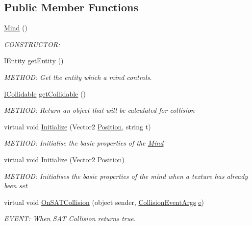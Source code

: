 \subsection*{Public Member Functions}
\begin{DoxyCompactItemize}
\item 
\hyperlink{a00318_aa352dcc92860d1304d4b1c71a0fe5d96}{Mind} ()
\begin{DoxyCompactList}\small\item\em C\+O\+N\+S\+T\+R\+U\+C\+T\+OR\+: \end{DoxyCompactList}\item 
\hyperlink{a00438}{I\+Entity} \hyperlink{a00318_a9585d4438e12299a42aaed4ee6fb88b6}{get\+Entity} ()
\begin{DoxyCompactList}\small\item\em M\+E\+T\+H\+OD\+: Get the entity which a mind controls. \end{DoxyCompactList}\item 
\hyperlink{a00426}{I\+Collidable} \hyperlink{a00318_aa36d6fcb8d80f1398855cea671ce1078}{get\+Collidable} ()
\begin{DoxyCompactList}\small\item\em M\+E\+T\+H\+OD\+: Return an object that will be calculated for collision \end{DoxyCompactList}\item 
virtual void \hyperlink{a00318_a386406a6250e4f7e59d0a048545ecc46}{Initialize} (Vector2 \hyperlink{a00318_ad94b3975c0873fee06b5bd5a75bd38cd}{Position}, string t)
\begin{DoxyCompactList}\small\item\em M\+E\+T\+H\+OD\+: Initialise the basic properties of the \hyperlink{a00318}{Mind} \end{DoxyCompactList}\item 
virtual void \hyperlink{a00318_a353d7d2bb1035aefebf0ae3e3f1d1488}{Initialize} (Vector2 \hyperlink{a00318_ad94b3975c0873fee06b5bd5a75bd38cd}{Position})
\begin{DoxyCompactList}\small\item\em M\+E\+T\+H\+OD\+: Initialises the basic properties of the mind when a texture has already been set \end{DoxyCompactList}\item 
virtual void \hyperlink{a00318_ac278d4358d794426251d1b87b6aa7b82}{On\+S\+A\+T\+Collision} (object sender, \hyperlink{a00350}{Collision\+Event\+Args} \hyperlink{a00318_ad89c9691d6b32053fe8ffcdeb68bdacf}{e})
\begin{DoxyCompactList}\small\item\em E\+V\+E\+NT\+: When S\+AT Collision returns true. \end{DoxyCompactList}\item 

\end{DoxyCompactItemize}
